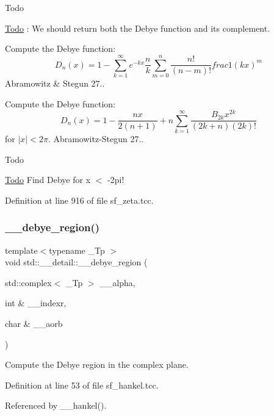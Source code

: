 \begin{DoxyRefDesc}{Todo}
\item[\hyperlink{todo__todo000018}{Todo}]\+: We should return both the Debye function and it\textquotesingle{}s complement. \end{DoxyRefDesc}
Compute the Debye function\+: \[ D_n(x) = 1 - \sum_{k = 1}^{\infty} e^{-kx} \frac{n}{k}\sum_{m=0}^{n}\frac{n!}{(n-m)!}frac{1}{(kx)^m} \] Abramowitz \& Stegun 27..

Compute the Debye function\+: \[ D_n(x) = 1 - \frac{n x}{2(n+1)} + n \sum_{k = 1}^{\infty} \frac{B_{2k} x^{2k}}{(2k + n)(2k)!} \] for $ |x| < 2\pi $. Abramowitz-\/\+Stegun 27..

\begin{DoxyRefDesc}{Todo}
\item[\hyperlink{todo__todo000019}{Todo}]Find Debye for x $<$ -\/2pi! \end{DoxyRefDesc}


Definition at line 916 of file sf\+\_\+zeta.\+tcc.

\mbox{\label{namespacestd_1_1____detail_a3212c0a136417e862f2ed8e9684e053c}} 
\subsubsection{\texorpdfstring{\+\_\+\+\_\+debye\+\_\+region()}{\_\_debye\_region()}}
{\footnotesize\ttfamily template$<$typename \+\_\+\+Tp $>$ \\
void std\+::\+\_\+\+\_\+detail\+::\+\_\+\+\_\+debye\+\_\+region (\begin{DoxyParamCaption}\item[{std\+::complex$<$ \+\_\+\+Tp $>$}]{\+\_\+\+\_\+alpha,  }\item[{int \&}]{\+\_\+\+\_\+indexr,  }\item[{char \&}]{\+\_\+\+\_\+aorb }\end{DoxyParamCaption})}

Compute the Debye region in the complex plane. 

Definition at line 53 of file sf\+\_\+hankel.\+tcc.



Referenced by \+\_\+\+\_\+hankel().

